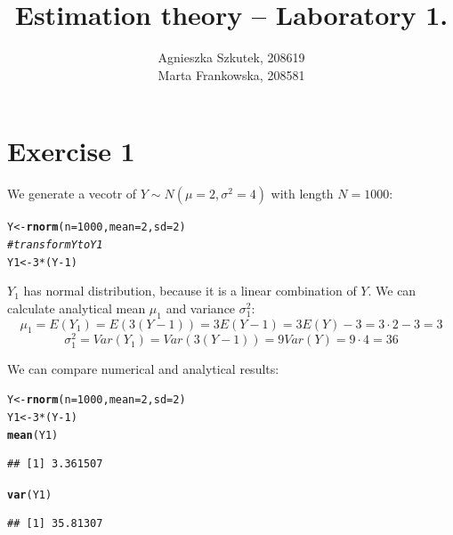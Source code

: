 \documentclass[12pt, a4paper]{article}\usepackage[]{graphicx}\usepackage[]{color}
\makeatletter
\newcommand{\hlnum}[1]{\textcolor[rgb]{0.686,0.059,0.569}{#1}}%
\newcommand{\hlcom}[1]{\textcolor[rgb]{0.678,0.584,0.686}{\textit{#1}}}%
\newcommand{\hlopt}[1]{\textcolor[rgb]{0,0,0}{#1}}%
\newcommand{\hlstd}[1]{\textcolor[rgb]{0.345,0.345,0.345}{#1}}%
\newcommand{\hlkwb}[1]{\textcolor[rgb]{0.69,0.353,0.396}{#1}}%
\newcommand{\hlkwc}[1]{\textcolor[rgb]{0.333,0.667,0.333}{#1}}%
\newcommand{\hlkwd}[1]{\textcolor[rgb]{0.737,0.353,0.396}{\textbf{#1}}}%
\newenvironment{kframe}{%
 \def\at@end@of@kframe{}%
 \ifinner\ifhmode%
  \def\at@end@of@kframe{\end{minipage}}%
  \begin{minipage}{\columnwidth}%
 \fi\fi%
 \def\FrameCommand##1{\hskip\@totalleftmargin \hskip-\fboxsep
 \colorbox{shadecolor}{##1}\hskip-\fboxsep
     \hskip-\linewidth \hskip-\@totalleftmargin \hskip\columnwidth}%
 \MakeFramed {\advance\hsize-\width
   \@totalleftmargin\z@ \linewidth\hsize
   \@setminipage}}%
 {\par\unskip\endMakeFramed%
 \at@end@of@kframe}
\newenvironment{knitrout}{}{} %
\makeatother
\begin{document}
\title{Estimation theory -- Laboratory 1.}
\author{Agnieszka Szkutek, 208619 \\ Marta Frankowska, 208581}
\maketitle
\tableofcontents 


\section{Exercise 1}

We generate a vecotr of $Y\sim N(\mu=2, \sigma^2=4)$ with length $N = 1000$:
\begin{knitrout}
\color{fgcolor}\begin{kframe}
\begin{alltt}
\hlstd{Y} \hlkwb{<-} \hlkwd{rnorm}\hlstd{(}\hlkwc{n} \hlstd{=} \hlnum{1000}\hlstd{,} \hlkwc{mean} \hlstd{=} \hlnum{2}\hlstd{,} \hlkwc{sd} \hlstd{=} \hlnum{2}\hlstd{)}
\hlcom{# transform Y to Y1}
\hlstd{Y1} \hlkwb{<-} \hlnum{3} \hlopt{*} \hlstd{(Y} \hlopt{-} \hlnum{1}\hlstd{)}
\end{alltt}
\end{kframe}
\end{knitrout}
$Y_1$ has normal distribution, because it is a linear combination of $Y$. We can calculate analytical mean $\mu_1$ and variance $\sigma^2_1$:
\[ \mu_1 = E(Y_1) = E(3 (Y-1)) = 3 E(Y - 1) = 3 E(Y) - 3 = 3 \cdot 2 - 3 = 3\]
\[ \sigma^2_1 = Var(Y_1) = Var(3 (Y-1)) = 9 Var(Y) = 9 \cdot 4 = 36 \]

We can compare numerical and analytical results:
\begin{knitrout}
\color{fgcolor}\begin{kframe}
\begin{alltt}
\hlstd{Y} \hlkwb{<-} \hlkwd{rnorm}\hlstd{(}\hlkwc{n} \hlstd{=} \hlnum{1000}\hlstd{,} \hlkwc{mean} \hlstd{=} \hlnum{2}\hlstd{,} \hlkwc{sd} \hlstd{=} \hlnum{2}\hlstd{)}
\hlstd{Y1} \hlkwb{<-} \hlnum{3} \hlopt{*} \hlstd{(Y} \hlopt{-} \hlnum{1}\hlstd{)}
\hlkwd{mean}\hlstd{(Y1)}
\end{alltt}
\begin{verbatim}
## [1] 3.361507
\end{verbatim}
\begin{alltt}
\hlkwd{var}\hlstd{(Y1)}
\end{alltt}
\begin{verbatim}
## [1] 35.81307
\end{verbatim}
\end{kframe}
\end{knitrout}
\end{document}
